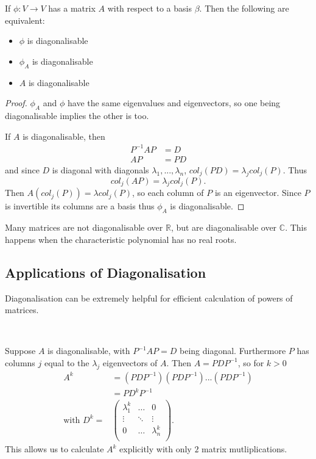 \begin{prop}
    If $\phi : V \rightarrow V$ has a matrix $A$ with respect to a basis $\beta$. Then the following are equivalent:
    \begin{itemize}
      \item $\phi$ is diagonalisable
      \item $\phi_A$ is diagonalisable
      \item $A$ is diagonalisable
    \end{itemize}
\end{prop}
\begin{proof}
  $\phi_A$ and $\phi$ have the same eigenvalues and eigenvectors, so one being diagonalisable implies the other is too.

  \noindent If $A$ is diagonalisable, then
  \begin{align*}
    P^{-1} A P &= D \\
    A P &= P D
  \end{align*}
  and since $D$ is diagonal with diagonals $\lambda_1,...,\lambda_n$, $col_j(PD) = \lambda_j col_j(P)$. Thus
  \[col_j(AP) = \lambda_j col_j(P).\]
  Then $A (col_j(P)) = \lambda col_j(P)$, so each column of $P$ is an eigenvector. Since $P$ is invertible its columns are a basis thus $\phi_A$ is diagonalisable.
\end{proof}

\begin{remark}
    Many matrices are not diagonalisable over $\mathbb{R}$, but are diagonalisable over $\mathbb{C}$. This happens when the characteristic polynomial has no real roots.
\end{remark}

\subsection{Applications of Diagonalisation}

Diagonalisation can be extremely helpful for efficient calculation of powers of matrices.
\begin{example} $ $
    
Suppose $A$ is diagonalisable, with $P^{-1}AP = D$ being diagonal. Furthermore $P$ has columns $j$ equal to the $\lambda_j$ eigenvectors of $A$.
  Then $A = PDP^{-1}$, so for $k > 0$
  \begin{align*}
    A^k &= (PDP^{-1})(PDP^{-1})...(PDP^{-1}) \\
        &= PD^kP^{-1} \\
    \text{with } D^k = &\begin{pmatrix}
  \lambda_1^k & \dots & 0\\
  \vdots & \ddots & \vdots\\
  0 & \dots & \lambda_n^k\\
  \end{pmatrix}
  .\end{align*}
  This allows us to calculate $A^k$ explicitly with only $2$ matrix mutliplications.
\end{example}


